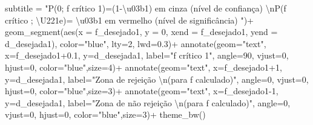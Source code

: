 \documentclass[
]{book}
\newenvironment{Shaded}{\begin{snugshade}}{\end{snugshade}}
\newcommand{\AttributeTok}[1]{\textcolor[rgb]{0.77,0.63,0.00}{#1}}
\newcommand{\DecValTok}[1]{\textcolor[rgb]{0.00,0.00,0.81}{#1}}
\newcommand{\FloatTok}[1]{\textcolor[rgb]{0.00,0.00,0.81}{#1}}
\newcommand{\FunctionTok}[1]{\textcolor[rgb]{0.00,0.00,0.00}{#1}}
\newcommand{\NormalTok}[1]{#1}
\newcommand{\SpecialCharTok}[1]{\textcolor[rgb]{0.00,0.00,0.00}{#1}}
\newcommand{\StringTok}[1]{\textcolor[rgb]{0.31,0.60,0.02}{#1}}
\begin{document}
\begin{Shaded}
\begin{Highlighting}[]
  \AttributeTok{subtitle =} \StringTok{"P(0; f crítico 1)=(1{-}\textbackslash{}u03b1) em cinza (nível de confiança) }\SpecialCharTok{\textbackslash{}n}\StringTok{P(f crítico ; \textbackslash{}U221e)= \textbackslash{}u03b1 em vermelho (nível de significância) "}\NormalTok{)}\SpecialCharTok{+}
  \FunctionTok{geom\_segment}\NormalTok{(}\FunctionTok{aes}\NormalTok{(}\AttributeTok{x =}\NormalTok{ f\_desejado1, }\AttributeTok{y =} \DecValTok{0}\NormalTok{, }\AttributeTok{xend =}\NormalTok{ f\_desejado1, }\AttributeTok{yend =}\NormalTok{ d\_desejada1), }\AttributeTok{color=}\StringTok{"blue"}\NormalTok{, }\AttributeTok{lty=}\DecValTok{2}\NormalTok{, }\AttributeTok{lwd=}\FloatTok{0.3}\NormalTok{)}\SpecialCharTok{+}
  \FunctionTok{annotate}\NormalTok{(}\AttributeTok{geom=}\StringTok{"text"}\NormalTok{, }\AttributeTok{x=}\NormalTok{f\_desejado1}\FloatTok{+0.1}\NormalTok{, }\AttributeTok{y=}\NormalTok{d\_desejada1, }\AttributeTok{label=}\StringTok{"f crítico 1"}\NormalTok{, }\AttributeTok{angle=}\DecValTok{90}\NormalTok{, }\AttributeTok{vjust=}\DecValTok{0}\NormalTok{, }\AttributeTok{hjust=}\DecValTok{0}\NormalTok{, }\AttributeTok{color=}\StringTok{"blue"}\NormalTok{,}\AttributeTok{size=}\DecValTok{4}\NormalTok{)}\SpecialCharTok{+}
 \FunctionTok{annotate}\NormalTok{(}\AttributeTok{geom=}\StringTok{"text"}\NormalTok{, }\AttributeTok{x=}\NormalTok{f\_desejado1}\SpecialCharTok{+}\DecValTok{1}\NormalTok{, }\AttributeTok{y=}\NormalTok{d\_desejada1, }\AttributeTok{label=}\StringTok{"Zona de rejeição }\SpecialCharTok{\textbackslash{}n}\StringTok{(para f calculado)"}\NormalTok{, }\AttributeTok{angle=}\DecValTok{0}\NormalTok{, }\AttributeTok{vjust=}\DecValTok{0}\NormalTok{, }\AttributeTok{hjust=}\DecValTok{0}\NormalTok{, }\AttributeTok{color=}\StringTok{"blue"}\NormalTok{,}\AttributeTok{size=}\DecValTok{3}\NormalTok{)}\SpecialCharTok{+}
  \FunctionTok{annotate}\NormalTok{(}\AttributeTok{geom=}\StringTok{"text"}\NormalTok{, }\AttributeTok{x=}\NormalTok{f\_desejado1}\DecValTok{{-}1}\NormalTok{, }\AttributeTok{y=}\NormalTok{d\_desejada1, }\AttributeTok{label=}\StringTok{"Zona de não rejeição  }\SpecialCharTok{\textbackslash{}n}\StringTok{(para f calculado)"}\NormalTok{, }\AttributeTok{angle=}\DecValTok{0}\NormalTok{, }\AttributeTok{vjust=}\DecValTok{0}\NormalTok{, }\AttributeTok{hjust=}\DecValTok{0}\NormalTok{, }\AttributeTok{color=}\StringTok{"blue"}\NormalTok{,}\AttributeTok{size=}\DecValTok{3}\NormalTok{)}\SpecialCharTok{+}
  \FunctionTok{theme\_bw}\NormalTok{()}
\end{Highlighting}
\end{Shaded}
\end{document}
